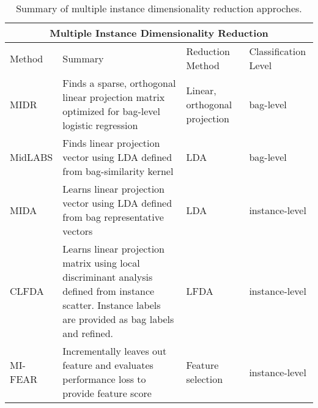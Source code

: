 \begin{table}[H]
\caption{Summary of multiple instance dimensionality reduction approches.}
\label{tab:MIDRComparison}
\begin{tabular}{ |p{2cm}||p{6cm}|p{2cm}|p{3cm}|  } 
	\hline
	\multicolumn{4}{|c|}{\textbf{Multiple Instance Dimensionality Reduction}} \\
	\hline
	Method & Summary & Reduction Method & Classification Level\\
	\hline
	MIDR   & Finds a sparse, orthogonal linear projection matrix optimized for bag-level logistic regression   &Linear, orthogonal projection  &  bag-level\\
	MidLABS&  Finds linear projection vector using LDA defined from bag-similarity kernel  & LDA   & bag-level\\
	MIDA &Learns linear projection vector using LDA defined from bag representative vectors & LDA &  instance-level\\
	CLFDA  &Learns linear projection matrix using local discriminant analysis defined from instance scatter.  Instance labels are provided as bag labels and refined. & LFDA &  instance-level\\
	MI-FEAR &  Incrementally leaves out feature and evaluates performance loss to provide feature score  & Feature selection & instance-level\\
	\hline
\end{tabular}
\end{table}


